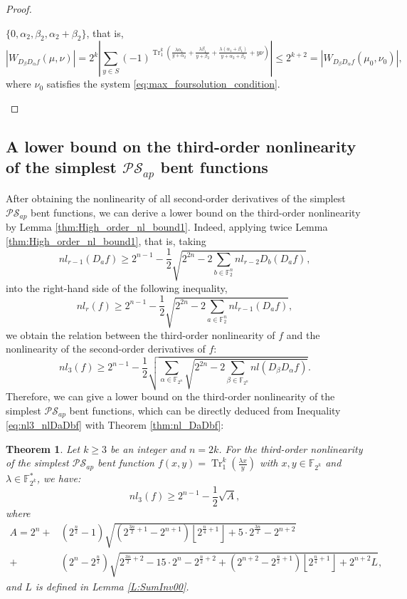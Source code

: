 \documentclass{article}
\newcommand{\F}{\mathbb{F}}
\newcommand{\0}{\textbf{0}}
\newcommand{\1}{\textbf{1}}
\newcommand{\TRACE}{\operatorname{Tr}_1^k}
\theoremstyle{plain}
\newtheorem{theorem}{Theorem}
\begin{document}
\begin{proof}
\begin{enumerate}[label=\textbf{Case \arabic*},wide = 0pt]
            $\{0,\alpha_2,\beta_2,\alpha_2+\beta_2\}$, that is,
            \[ |W_{D_{\beta}D_{\alpha}f}(\mu,\nu)|=2^k\left\lvert\sum_{y\in S}(-1)^{\TRACE\left(\frac{\lambda\alpha_1}{y+\alpha_2}+\frac{\lambda\beta_1}{y+\beta_2}+\frac{\lambda(\alpha_1+\beta_1)}{y+\alpha_2+\beta_2}+ y\nu\right)}\right\rvert\le 2^{k+2}=|W_{D_{\beta}D_{\alpha}f}(\mu_0,\nu_0)|, \]
            where $\nu_0$ satisfies the system \eqref{eq:max_foursolution_condition}.
        \end{enumerate}
    \end{proof}

\subsection{A lower bound on the third-order nonlinearity of the simplest $\mathcal{PS}_{ap}$ bent functions}
    After obtaining the nonlinearity of all second-order derivatives of the simplest $\mathcal{PS}_{ap}$ bent functions, we can derive a lower bound on the third-order nonlinearity by Lemma \ref{thm:High_order_nl_bound1}.
    Indeed, applying twice Lemma \ref{thm:High_order_nl_bound1}, that is, taking
    \[nl_{r-1}(D_af) \ge 2^{n-1}-\frac{1}{2}\sqrt{2^{2n}-2\sum_{b\in\F_2^n}nl_{r-2}D_b(D_af)},\]
    into the right-hand side of the following inequality,
    \[nl_r(f) \ge 2^{n-1}-\frac{1}{2}\sqrt{2^{2n}-2\sum_{a\in\F_2^n}nl_{r-1}(D_af)},\]
    we obtain the relation between the third-order nonlinearity of $f$ and the nonlinearity of the second-order derivatives of $f$:
    \begin{equation}\label{eq:nl3_nlDaDbf}
        nl_3(f)\ge 2^{n-1}-\frac{1}{2}\sqrt{\sum_{\alpha\in\F_{2^n}}\sqrt{2^{2n}-2\sum_{\beta\in\F_{2^n}} nl(D_{\beta}D_{\alpha}f)}}.
    \end{equation}
    Therefore, we can give a lower bound on the third-order nonlinearity of the simplest $\mathcal{PS}_{ap}$ bent functions, which can be directly deduced from Inequality \eqref{eq:nl3_nlDaDbf} with Theorem \ref{thm:nl_DaDbf}:
    \begin{theorem}\label{th:our_lower_bound}
        Let $k\ge 3$ be an integer and $n=2k$. For the third-order nonlinearity of the simplest $\mathcal{PS}_{ap}$ bent function $f(x,y)=\TRACE(\frac{\lambda x}{y})$ with $x,y\in\F_{2^k}$ and $\lambda\in\F_{2^k}^*$, we have:
        \[nl_3(f)\ge 2^{n-1}-\frac{1}{2}\sqrt{A},\]
        where
        \begin{align*}
            A=2^n+&(2^{\frac{n}{2}}-1)\sqrt{(2^{\frac{3n}{2}+1}-2^{n+1})\left\lfloor 2^{\frac{n}{4}+1}\right\rfloor+5\cdot 2^{\frac{3n}{2}}-2^{n+2}}\\
            +&(2^n-2^{\frac{n}{2}})\sqrt{2^{\frac{3n}{2}+2}-15\cdot 2^n-2^{\frac{n}{2}+2}+(2^{n+2}-2^{\frac{n}{2}+1})\left\lfloor 2^{\frac{n}{4}+1}\right\rfloor+2^{n+2}L},
        \end{align*}
        and $L$ is defined in Lemma \ref{L:SumInv00}.
    \end{theorem}
\end{document}
